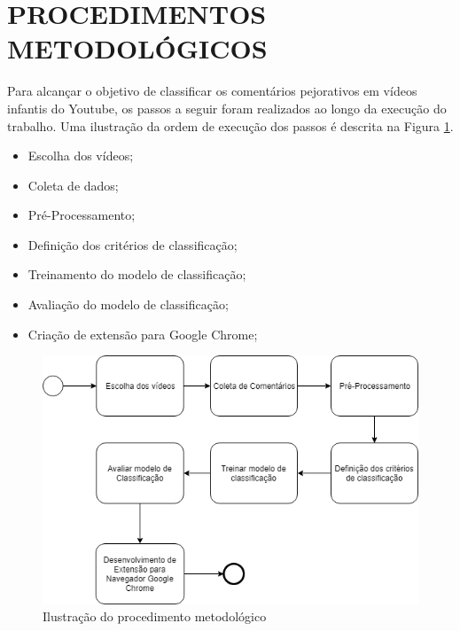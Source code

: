 \section{PROCEDIMENTOS METODOLÓGICOS}

Para alcançar o objetivo de classificar os comentários pejorativos em vídeos infantis do Youtube, os passos a seguir foram realizados ao longo da execução do trabalho.
Uma ilustração da ordem de execução dos passos é descrita na Figura \ref{fig:metodologia}.

\begin{itemize}
    \item Escolha dos vídeos;
    \item Coleta de dados;
    \item Pré-Processamento;
    \item Definição dos critérios de classificação;
    \item Treinamento do modelo de classificação;
    \item Avaliação do modelo de classificação;
    \item Criação de extensão para Google Chrome;
    
\end{itemize}

\begin{figure}[H] %
	\caption{\label{fig:metodologia} Ilustração do procedimento metodológico}
	\begin{center}
	    \includegraphics[scale=0.7]{figuras/figura_6.png} %
	\end{center}
\end{figure}


